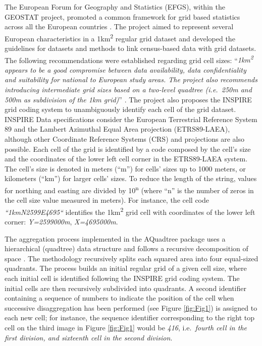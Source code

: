 The European Forum for Geography and Statistics (EFGS), within the GEOSTAT project, promoted a common framework for grid based statistics across all the European countries \citep{GEOSTAT1A2011, GEOSTAT1B2014}. The project aimed to represent several European characteristics in a 1km\textsuperscript{2} regular grid dataset and developed the guidelines for datasets and methods to link census-based data with grid datasets. The following recommendations were established regarding grid cell sizes: “\textit{1km\textsuperscript{2} appears to be a good compromise between data availability, data confidentiality and suitability for national to European study areas. The project also recommends introducing intermediate grid sizes based on a two-level quadtree (i.e.\ 250m and 500m as subdivision of the 1km grid)}” \citep[p.~17]{GEOSTAT1A2011}. The project also proposes the INSPIRE grid coding system \citep{INSPIRE2010} to unambiguously identify each cell of the grid dataset. INSPIRE Data specifications consider the European Terrestrial Reference System 89 and the Lambert Azimuthal Equal Area projection (ETRS89-LAEA), although other Coordinate Reference Systems (CRS) and projections are also possible. Each cell of the grid is identified by a code composed by the cell's size and the coordinates of the lower left cell corner in the ETRS89-LAEA system. The cell's size is denoted in meters (“m”) for cells' sizes up to 1000 meters, or kilometers (“km”) for larger cells' sizes. To reduce the length of the string, values for northing and easting are divided by 10\textsuperscript{n} (where “n” is the number of zeros in the cell size value measured in meters). For instance, the cell code \emph{“1kmN2599E4695“} identifies the 1km\textsuperscript{2} grid cell with coordinates of the lower left corner: \emph{Y=2599000m}, \emph{X=4695000m}.

The aggregation process implemented in the AQuadtree package uses a hierarchical (quadtree) data structure and follows a recursive decomposition of space \citep{Samet1984, Behnisch2013}. The methodology recursively splits each squared area into four equal-sized quadrants. The process builds an initial regular grid of a given cell size, where each initial cell is identified following the INSPIRE grid coding system. The initial cells are then recursively subdivided into quadrants. A second identifier containing a sequence of numbers to indicate the position of the cell when successive disaggregation has been performed (see Figure \ref{fig:Fig1}) is assigned to each new cell; for instance, the sequence identifier corresponding to the right top cell on the third image in Figure \ref{fig:Fig1} would be \emph{416}, i.e.\ \emph{fourth cell in the first division, and sixteenth cell in the second division}.

